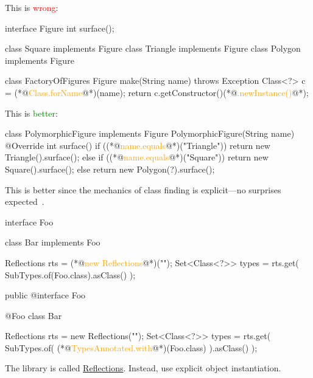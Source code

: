 \documentclass{article}
\begin{document}
\begin{pptWide}{2}
This is \textcolor{red}{wrong}:
\par
{\scriptsize\begin{ffcode}
interface Figure
  int surface();

class Square implements Figure
class Triangle implements Figure
class Polygon implements Figure

class FactoryOfFigures
  Figure make(String name) throws Exception {
    Class<?> c = (*@\textcolor{orange}{Class.forName}@*)(name);
    return c.getConstructor()(*@\textcolor{orange}{.newInstance()}@*);
  }
\end{ffcode}
}
\par\columnbreak\par
This is \textcolor{green}{better}:
\par
{\scriptsize\begin{ffcode}
class PolymorphicFigure implements Figure
  PolymorphicFigure(String name)
  @Override int surface() {
    if ((*@\textcolor{orange}{name.equals}@*)("Triangle")) {
      return new Triangle().surface();
    } else if ((*@\textcolor{orange}{name.equals}@*)("Square")) {
      return new Square().surface();
    } else {
      return new Polygon(?).surface();
    }
  }
\end{ffcode}
}
\par
This is better since the mechanics of class finding
is explicit---no surprises expected~\citep{bugayenko2017blog1114}.
\end{pptWide}
\plush{}


\begin{pptWide}{2}
{\small\begin{ffcode}
interface Foo {}

class Bar implements Foo {}

Reflections rts =
  (*@\textcolor{orange}{new Reflections}@*)("");
Set<Class<?>> types = rts.get(
  SubTypes.of(Foo.class).asClass()
);
\end{ffcode}
}
\par\columnbreak\par
{\small\begin{ffcode}
public @interface Foo {}

@Foo
class Bar {}

Reflections rts =
  new Reflections("");
Set<Class<?>> types = rts.get(
  SubTypes.of(
    (*@\textcolor{orange}{TypesAnnotated.with}@*)(Foo.class)
  ).asClass()
);
\end{ffcode}
}
\end{pptWide}
\par
The library is called \href{https://github.com/ronmamo/reflections}{Reflections}.
Instead, use explicit object instantiation.
\plush{}
\end{document}
